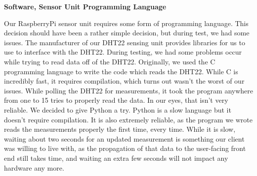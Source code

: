 \documentclass{report}
\begin{document}
\begin{center}
	\textbf{Software, Sensor Unit Programming Language}
\end{center}
\indent
\indent
Our RaspberryPi sensor unit requires some form of programming language. This decision should have been a rather simple decision, but during test, we had some issues. The manufacturer of our DHT22 sensing unit provides libraries for us to use to interface with the DHT22. During testing, we had some problems occur while trying to read data off of the DHT22. Originally, we used the C programming language to write the code which reads the DHT22. While C is incredibly fast, it requires compilation, which turns out wasn't the worst of our issues. While polling the DHT22 for measurements, it took the program anywhere from one to 15 tries to properly read the data. In our eyes, that isn't very reliable.
\newline
\indent
We decided to give Python a try. Python is a slow language but it doesn't require compilation. It is also extremely reliable, as the program we wrote reads the measurements properly the first time, every time. While it is slow, waiting about two seconds for an updated measurement is something our client was willing to live with, as the propagation of that data to the user-facing front end still takes time, and waiting an extra few seconds will not impact any hardware any more.
\newpage
\end{document}
